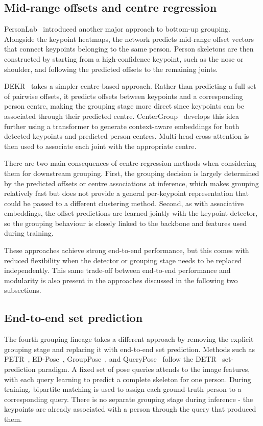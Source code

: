 \subsection{Mid-range offsets and centre regression}
\label{sec_lit_grouping_centre}

PersonLab~\cite{papandreou2018personlab} introduced another major approach to bottom-up grouping.
Alongside the keypoint heatmaps,
the network predicts mid-range offset vectors that connect keypoints belonging to the same person.
Person skeletons are then constructed by starting from a high-confidence keypoint, such as the nose or shoulder,
and following the predicted offsets to the remaining joints.

DEKR~\cite{geng2021dekr} takes a simpler centre-based approach.
Rather than predicting a full set of pairwise offsets,
it predicts offsets between keypoints and a corresponding person centre,
making the grouping stage more direct since keypoints can be associated through their predicted centre.
CenterGroup~\cite{braso2021centergroup} develops this idea further
using a transformer to generate context-aware embeddings for both detected keypoints and predicted person centres.
Multi-head cross-attention is then used to associate each joint with the appropriate centre.

There are two main consequences of centre-regression methods when considering them for downstream grouping.
First, the grouping decision is largely determined by the predicted offsets or centre associations at inference,
which makes grouping relatively fast
but does not provide a general per-keypoint representation that could be passed to a different clustering method.
Second, as with associative embeddings,
the offset predictions are learned jointly with the keypoint detector,
so the grouping behaviour is closely linked to the backbone and features used during training.

These approaches achieve strong end-to-end performance,
but this comes with reduced flexibility when the detector or grouping stage needs to be replaced independently.
This same trade-off between end-to-end performance and modularity
is also present in the approaches discussed in the following two subsections.

\subsection{End-to-end set prediction}
\label{sec_lit_grouping_setpred}

The fourth grouping lineage takes a different approach
by removing the explicit grouping stage and replacing it with end-to-end set prediction.
Methods such as PETR~\cite{shi2022petr}, ED-Pose~\cite{yang2023edpose},
GroupPose~\cite{liu2023grouppose}, and QueryPose~\cite{xiao2022querypose}
follow the DETR~\cite{carion2020detr} set-prediction paradigm.
A fixed set of pose queries attends to the image features,
with each query learning to predict a complete skeleton for one person.
During training, bipartite matching is used to assign each ground-truth person to a corresponding query.
There is no separate grouping stage during inference -
the keypoints are already associated with a person through the query that produced them.

